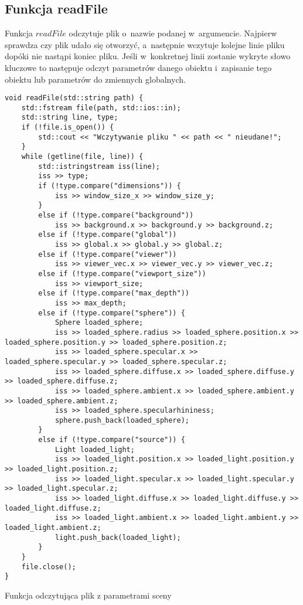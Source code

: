 \documentclass[11pt,a4paper,titlepage]{article}
\newenvironment{longlisting}{\captionsetup{type=listing}}{}
\begin{document}
\subsection{Funkcja readFile}
Funkcja $readFile$ odczytuje plik o~nazwie podanej w~argumencie. Najpierw sprawdza czy plik udało się otworzyć, a~następnie wczytuje kolejne linie pliku dopóki nie nastąpi koniec pliku. Jeśli w~konkretnej linii zostanie wykryte słowo kluczowe to następuje odczyt parametrów danego obiektu i~zapisanie tego obiektu lub parametrów do zmiennych globalnych.
\begin{longlisting}
\begin{verbatim}
void readFile(std::string path) {
	std::fstream file(path, std::ios::in);
	std::string line, type;
	if (!file.is_open()) {
		std::cout << "Wczytywanie pliku " << path << " nieudane!";
	}
	while (getline(file, line)) {
		std::istringstream iss(line);
		iss >> type;
		if (!type.compare("dimensions")) {
			iss >> window_size_x >> window_size_y;
		}
		else if (!type.compare("background"))
			iss >> background.x >> background.y >> background.z;
		else if (!type.compare("global"))
			iss >> global.x >> global.y >> global.z;
		else if (!type.compare("viewer"))
			iss >> viewer_vec.x >> viewer_vec.y >> viewer_vec.z;
		else if (!type.compare("viewport_size"))
			iss >> viewport_size;
		else if (!type.compare("max_depth"))
			iss >> max_depth;
		else if (!type.compare("sphere")) {
			Sphere loaded_sphere;
			iss >> loaded_sphere.radius >> loaded_sphere.position.x >> loaded_sphere.position.y >> loaded_sphere.position.z;
			iss >> loaded_sphere.specular.x >> loaded_sphere.specular.y >> loaded_sphere.specular.z;
			iss >> loaded_sphere.diffuse.x >> loaded_sphere.diffuse.y >> loaded_sphere.diffuse.z;
			iss >> loaded_sphere.ambient.x >> loaded_sphere.ambient.y >> loaded_sphere.ambient.z;
			iss >> loaded_sphere.specularhininess;
			sphere.push_back(loaded_sphere);
		}
		else if (!type.compare("source")) {
			Light loaded_light;
			iss >> loaded_light.position.x >> loaded_light.position.y >> loaded_light.position.z;
			iss >> loaded_light.specular.x >> loaded_light.specular.y >> loaded_light.specular.z;
			iss >> loaded_light.diffuse.x >> loaded_light.diffuse.y >> loaded_light.diffuse.z;
			iss >> loaded_light.ambient.x >> loaded_light.ambient.y >> loaded_light.ambient.z;
			light.push_back(loaded_light);
		}
	}
	file.close();
}
\end{verbatim}
\caption{Funkcja odczytująca plik z parametrami sceny}
\end{longlisting}
\end{document}
